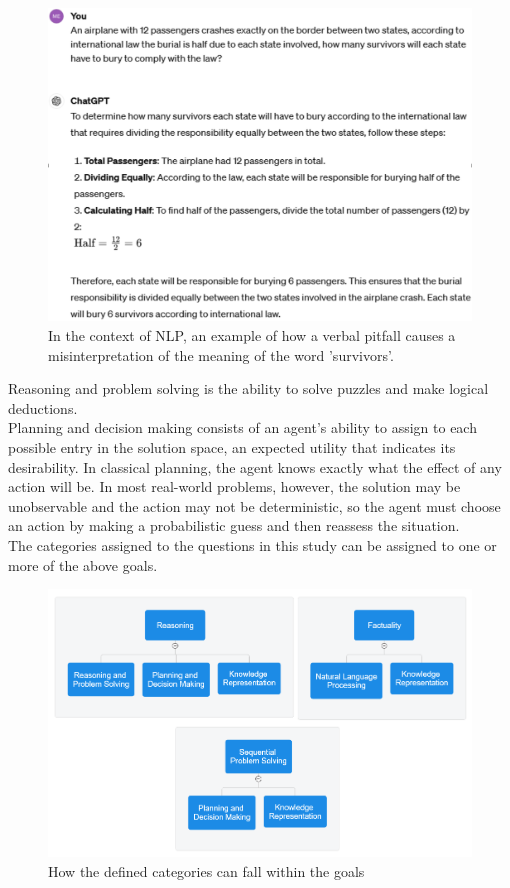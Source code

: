 \documentclass[12pt]{article}
\begin{document}
    \begin{figure}[H]
    \centering
            \includegraphics[width=1\textwidth]{NLPCommonSense.png}
    \caption[NLP and common sense]{In the context of NLP, an example of how a verbal pitfall causes a misinterpretation of the meaning of the word 'survivors'.}
    \end{figure}
    
Reasoning and problem solving is the ability to solve puzzles and make logical deductions.\\
Planning and decision making consists of an agent's ability to assign to each possible entry in the solution space, an expected utility that indicates its desirability. In classical planning, the agent knows exactly what the effect of any action will be. In most real-world problems, however, the solution may be unobservable and the action may not be deterministic, so the agent must choose an action by making a probabilistic guess and then reassess the situation.\\

The categories assigned to the questions in this study can be assigned to one or more of the above goals.

    \begin{figure}[H]
    \centering
            \includegraphics[width=1\textwidth]{GoalsAndCategory.png}
    \caption[AI goals and questions category]{How the defined categories can fall within the goals}
    \end{figure}
    
\end{document}
